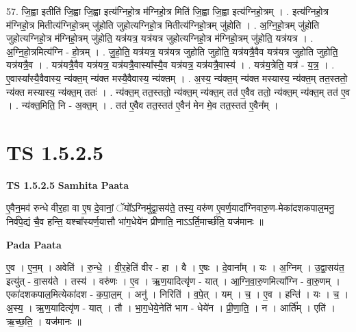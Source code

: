 \documentclass[17pt]{extarticle}
\begin{document}
57. जि॒ह्वा इतीति॑ जि॒ह्वा जि॒ह्वा इत्य॑ग्निहो॒त्र म॑ग्निहो॒त्र मिति॑ जि॒ह्वा जि॒ह्वा इत्य॑ग्निहो॒त्रम् । . इत्य॑ग्निहो॒त्र म॑ग्निहो॒त्र मितीत्य॑ग्निहो॒त्रम् जु॑होति जुहोत्यग्निहो॒त्र मितीत्य॑ग्निहो॒त्रम् जु॑होति । . अ॒ग्नि॒हो॒त्रम् जु॑होति जुहोत्यग्निहो॒त्र म॑ग्निहो॒त्रम् जु॑होति॒ यत्र॑यत्र॒ यत्र॑यत्र जुहोत्यग्निहो॒त्र म॑ग्निहो॒त्रम् जु॑होति॒ यत्र॑यत्र । . अ॒ग्नि॒हो॒त्रमित्य॑ग्नि - हो॒त्रम् । . जु॒हो॒ति॒ यत्र॑यत्र॒ यत्र॑यत्र जुहोति जुहोति॒ यत्र॑यत्रै॒वैव यत्र॑यत्र जुहोति जुहोति॒ यत्र॑यत्रै॒व । . यत्र॑यत्रै॒वैव यत्र॑यत्र॒ यत्र॑यत्रै॒वास्या᳚स्यै॒व यत्र॑यत्र॒ यत्र॑यत्रै॒वास्य॑ । . यत्र॑य॒त्रेति॒ यत्र॑ - य॒त्र॒ । . ए॒वास्या᳚स्यै॒वैवास्य॒ न्य॑क्त॒म् न्य॑क्त मस्यै॒वैवास्य॒ न्य॑क्तम् । . अ॒स्य॒ न्य॑क्त॒म् न्य॑क्त मस्यास्य॒ न्य॑क्त॒म् तत॒स्ततो॒ न्य॑क्त मस्यास्य॒ न्य॑क्त॒म् ततः॑ । . न्य॑क्त॒म् तत॒स्ततो॒ न्य॑क्त॒म् न्य॑क्त॒म् तत॑ ए॒वैव ततो॒ न्य॑क्त॒म् न्य॑क्त॒म् तत॑ ए॒व । . न्य॑क्त॒मिति॒ नि - अ॒क्त॒म् । . तत॑ ए॒वैव तत॒स्तत॑ ए॒वैन॑ मेन मे॒व तत॒स्तत॑ ए॒वैन᳚म् । \newline
\pagebreak
{}

\section{ TS 1.5.2.5 }

\textbf{TS 1.5.2.5 } \newline
\textbf{Samhita Paata} \newline

ए॒वैन॒मव॑ रुन्धे वीर॒हा वा ए॒ष दे॒वानां॒ ॅयो᳚ऽग्निमु॑द्वा॒सय॑ते॒ तस्य॒ वरु॑ण ए॒वर्ण॒यादा᳚ग्निवारु॒ण-मेका॑दशकपाल॒मनु॒ निर्व॑पे॒द्यं चै॒व हन्ति॒ यश्चा᳚स्यर्ण॒यात्तौ भा॑ग॒धेये॑न प्रीणाति॒ नाऽऽर्ति॒मार्च्छ॑ति॒ यज॑मानः ॥ \newline

\textbf{Pada Paata} \newline

ए॒व । ए॒न॒म् । अवेति॑ । रु॒न्धे॒ । वी॒र॒हेति॑ वीर - हा । वै । ए॒षः । दे॒वाना᳚म् । यः । अ॒ग्निम् । उ॒द्वा॒सय॑त॒ इत्यु॑त् - वा॒सय॑ते । तस्य॑ । वरु॑णः । ए॒व । ऋ॒ण॒यादित्यृ॑ण - यात् । आ॒ग्नि॒वा॒रु॒णमित्या᳚ग्नि - वा॒रु॒णम् । एका॑दशकपाल॒मित्येका॑दश - क॒पा॒ल॒म् । अनु॑ । निरिति॑ । व॒पे॒त् । यम् । च॒ । ए॒व । हन्ति॑ । यः । च॒ । अ॒स्य॒ । ऋ॒ण॒यादित्यृ॑ण - यात् । तौ । भा॒ग॒धेये॒नेति॑ भाग - धेये॑न । प्री॒णा॒ति॒ । न । आर्ति᳚म् । एति॑ । ऋ॒च्छ॒ति॒ । यज॑मानः ॥  \newline
\end{document}
